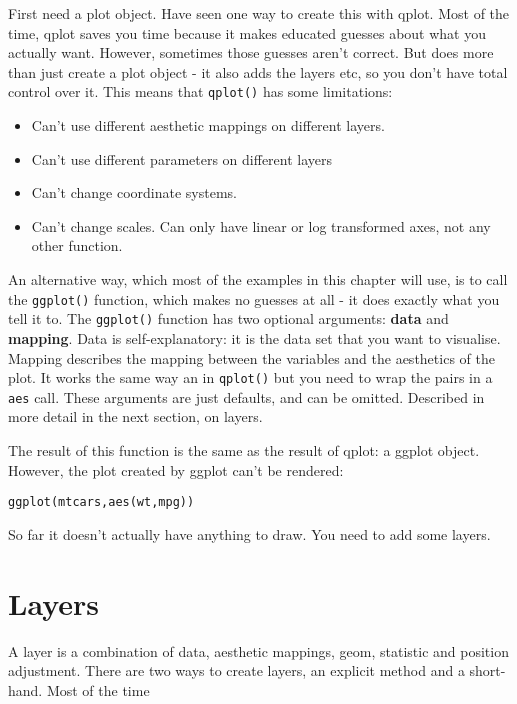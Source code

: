 First need a plot object.  Have seen one way to create this with qplot.  Most of the time, qplot saves you time because it makes educated guesses about what you actually want.  However, sometimes those guesses aren't correct.  But does more than just create a plot object - it also adds the layers etc, so you don't have total control over it. This means that {\tt qplot()} has some limitations:

\begin{itemize}
  \item Can't use different aesthetic mappings on different layers.  
  \item Can't use different parameters on different layers
  \item Can't change coordinate systems.  
  \item Can't change scales.  Can only have linear or log transformed axes, not any other function.
\end{itemize}

An alternative way, which most of the examples in this chapter will use, is to call the {\tt ggplot()} function, which makes no guesses at all - it does exactly what you tell it to.  The {\tt ggplot()} function has two optional arguments: {\bf data} and {\bf mapping}.  Data is self-explanatory: it is the data set that you want to visualise.  Mapping describes the mapping between the variables and the aesthetics of the plot.  It works the same way an in {\tt qplot()} but you need to wrap the pairs in a {\tt aes} call.  These arguments are just defaults, and can be omitted.  Described in more detail in the next section, on layers.

The result of this function is the same as the result of qplot: a ggplot object.  However, the plot created by ggplot can't be rendered:

\begin{alltt}
  ggplot(mtcars, aes(wt, mpg))
\end{alltt}

So far it doesn't actually have anything to draw.  You need to add some layers.

\section{Layers}\label{sec:layers}


A layer is a combination of data, aesthetic mappings, geom, statistic and position adjustment.  There are two ways to create layers, an explicit method and a short-hand.  Most of the time 

